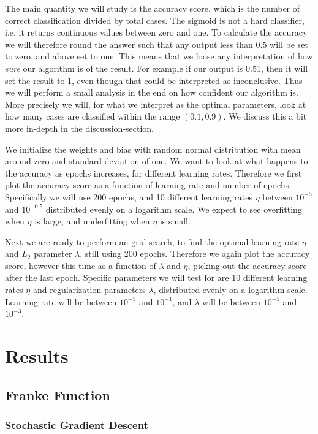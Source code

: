 \documentclass[12pt]{extarticle}
\begin{document}
The main quantity we will study is the accuracy score, which is the number of correct classification divided by total cases. The sigmoid is not a hard classifier, i.e. it returns continuous values between zero and one. To calculate the accuracy we will therefore round the answer such that any output less than 0.5 will be set to zero, and above set to one. This means that we loose any interpretation of how \emph{sure} our algorithm is of the result. For example if our output is 0.51, then it will set the result to 1, even though that could be interpreted as inconclusive. Thus we will perform a small analysis in the end on how confident our algorithm is. More precisely we will, for what we interpret as the optimal parameters, look at how many cases are classified within the range $(0.1, 0.9)$. We discuss this a bit more in-depth in the discussion-section.

We initialize the weights and bias with random normal distribution with mean around zero and standard deviation of one. We want to look at what happens to the accuracy as epochs increases, for different learning rates. Therefore we first plot the accuracy score as a function of learning rate and number of epochs. Specifically we will use 200 epochs, and 10 different learning rates $\eta$ between $10^{-5}$ and $10^{-0.5}$ distributed evenly on a logarithm scale. We expect to see overfitting when $\eta$ is large, and underfitting when $\eta$ is small.

Next we are ready to perform an grid search, to find the optimal learning rate $\eta$ and $L_2$ parameter $\lambda$, still using 200 epochs. Therefore we again plot the accuracy score, however this time as a function of $\lambda$ and $\eta$, picking out the accuracy score after the last epoch. Specific parameters we will test for are 10 different learning rates $\eta$ and regularization parameters $\lambda$, distributed evenly on a logarithm scale. Learning rate will be between $10^{-5}$ and $10^{-1}$, and $\lambda$ will be between $10^{-5}$ and $10^{-3}$.

\section{Results}

\subsection{Franke Function}
\subsubsection{Stochastic Gradient Descent}
\end{document}
